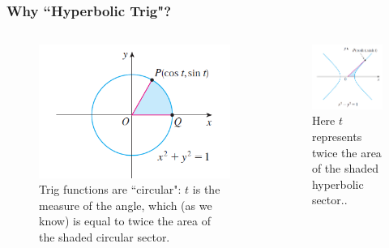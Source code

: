 \begin{frame} 
\frametitle{Why ``Hyperbolic Trig"?}

\begin{columns}
\begin{column}{.5\linewidth}
\begin{figure}
\centering
\includegraphics[width=\linewidth]{../../modules/hyperbolic-functions/pictures/trigCircle}
\caption{Trig functions are ``circular": $t$ is the measure of the angle, which (as we know) is equal to twice the area of the shaded circular sector.}
\label{fig:trigCircle}
\end{figure}

\end{column}
\begin{column}{.5\linewidth}
\pause 
\begin{figure}
\centering
\includegraphics[width=\linewidth]{../../modules/hyperbolic-functions/pictures/hyperbolicSector}
\caption{Here $ t $ represents twice the area of the shaded hyperbolic sector..}
\label{fig:hypCircle}
\end{figure}


\end{column}
\end{columns}
\end{frame}
